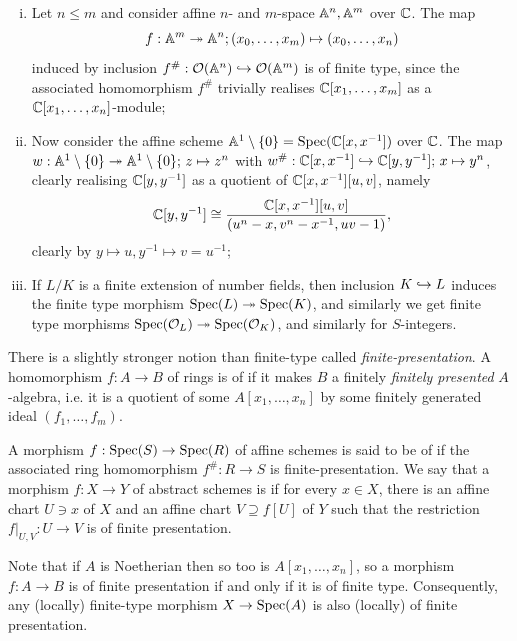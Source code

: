 \begin{eg}
	\label{eg:finite_type_morphism}
	\begin{enumerate}[(i)]
		\item Let $n \leq m$ and consider affine $n$- and $m$-space $\mathbb{A}^n, \mathbb{A}^m$ over $\mathbb{C}$. The map 
		\[
			f:\mathbb{A}^m \twoheadrightarrow \mathbb{A}^n; (x_0, \ldots, x_m) \mapsto (x_0, \ldots, x_n)
		\] 
		induced by inclusion $f^{\#} : \mathcal{O}(\mathbb{A}^n) \hookrightarrow \mathcal{O}(\mathbb{A}^m)$ is of finite type, since the associated homomorphism $f^{\#}$ trivially realises $\mathbb{C}[x_1, \ldots, x_m]$ as a $\mathbb{C}[x_1, \ldots, x_n]$-module;
		\item Now consider the affine scheme $\mathbb{A}^1\setminus\{0\} = \mathrm{Spec}(\mathbb{C}[x,x^{-1}])$ over $\mathbb{C}$. The map $w : \mathbb{A}^1\setminus\{0\} \twoheadrightarrow \mathbb{A}^1 \setminus \{0\}; \, z \mapsto z^n$ with $w^{\#} : \mathbb{C}[x,x^{-1}] \hookrightarrow \mathbb{C}[y, y^{-1}];\, x \mapsto y^n$, clearly realising $\mathbb{C}[y,y^{-1}]$ as a quotient of $\mathbb{C}[x,x^{-1}][u,v]$, namely
		\[
			\mathbb{C}[y,y^{-1}] \cong \frac{\mathbb{C}[x,x^{-1}][u,v]}{(u^n-x, v^n-x^{-1}, uv-1)},
		\]
		clearly by $y \mapsto u, y^{-1} \mapsto v = u^{-1}$;
		\item If $L/K$ is a finite extension of number fields, then inclusion $K \hookrightarrow L$ induces the finite type morphism $\mathrm{Spec}(L) \twoheadrightarrow \mathrm{Spec}(K)$, and similarly we get finite type morphisms $\mathrm{Spec}(\mathcal{O}_L) \twoheadrightarrow \mathrm{Spec}(\mathcal{O}_K)$, and similarly for $S$-integers.
	\end{enumerate}
\end{eg}

There is a slightly stronger notion than finite-type called \emph{finite-presentation}. A homomorphism $f:A \to B$ of rings is of  if it makes $B$ a finitely \emph{finitely presented} $A$-algebra, i.e. it is a quotient of some $A[x_1, \ldots, x_n]$ by some finitely generated ideal $(f_1, \ldots, f_m)$. 

\begin{defn}
	A morphism $f : \mathrm{Spec}(S) \to \mathrm{Spec}(R)$ of affine schemes is said to be of  if the associated ring homomorphism $f^{\#} : R \to S$ is finite-presentation. We say that a morphism $f : X \to Y$ of abstract schemes is  if for every $x \in X$, there is an affine chart $U \ni x$ of $X$ and an affine chart $V \supseteq f[U]$ of $Y$ such that the restriction $f|_{U,V} : U \to V$ is of finite presentation.
\end{defn}

Note that if $A$ is Noetherian then so too is $A[x_1, \ldots, x_n]$, so a morphism $f:A \to B$ is of finite presentation if and only if it is of finite type. Consequently, any (locally) finite-type morphism $X \to \mathrm{Spec}(A)$ is also (locally) of finite presentation.

